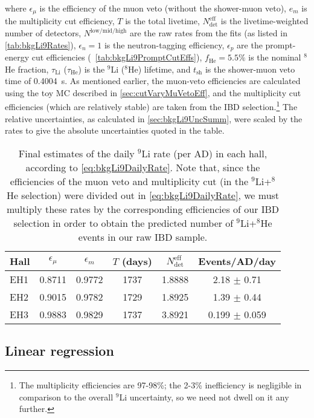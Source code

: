 \documentclass[../thesis.tex]{subfiles}
\begin{document}
where $\epsilon_\mu$ is the efficiency of the muon veto (without the shower-muon veto), $e_m$ is the multiplicity cut efficiency, $T$ is the total livetime, $N^{\mathrm{eff}}_{\mathrm{det}}$ is the livetime-weighted number of detectors, $N^{\mathrm{low/mid/high}}$ are the raw rates from the fits (as listed in \autoref{tab:bkgLi9Rates}), $\epsilon_n = 1$ is the neutron-tagging efficiency, $\epsilon_p$ are the prompt-energy cut efficiencies (~\autoref{tab:bkgLi9PromptCutEffs}), $f_{\mathrm{He}} = 5.5\%$ is the nominal $^8$He fraction, $\tau_{\mathrm{Li}}$ ($\tau_{\mathrm{He}}$) is the $^9$Li ($^8$He) lifetime, and $t_{\mathrm{sh}}$ is the shower-muon veto time of 0.4004~s. As mentioned earlier, the muon-veto efficiencies are calculated using the toy MC described in \autoref{sec:cutVaryMuVetoEff}, and the multiplicity cut efficiencies (which are relatively stable) are taken from the IBD selection.\footnote{The multiplicity efficiencies are 97-98\%; the 2-3\% inefficiency is negligible in comparison to the overall $^9$Li uncertainty, so we need not dwell on it any further.} The relative uncertainties, as calculated in \autoref{sec:bkgLi9UncSumm}, were scaled by the rates to give the absolute uncertainties quoted in the table.

\begin{table}[h]
  \begin{tabular}{lccccc}
    \toprule
    Hall & $\epsilon_\mu$ & $\epsilon_m$ & $T$ (days) & $N_{\mathrm{det}}^{\mathrm{eff}}$ & Events/AD/day \\
    \midrule
    EH1 & 0.8711 & 0.9772 & 1737 & 1.8888 & 2.18 $\pm$ 0.71 \\
    EH2 & 0.9015 & 0.9782 & 1729 & 1.8925 & 1.39 $\pm$ 0.44 \\
    EH3 & 0.9883 & 0.9829 & 1737 & 3.8921 & 0.199 $\pm$ 0.059 \\
    \bottomrule
  \end{tabular}
  \caption{Final estimates of the daily $^9$Li rate (per AD) in each hall, according to \autoref{eq:bkgLi9DailyRate}. Note that, since the efficiencies of the muon veto and multiplicity cut (in the $^9$Li+$^8$He selection) were divided out in \autoref{eq:bkgLi9DailyRate}, we must multiply these rates by the corresponding efficiencies of our IBD selection in order to obtain the predicted number of $^9$Li+$^8$He events in our raw IBD sample.}
  \label{tab:bkgLi9DailyRates}
\end{table}

\subsection{Linear regression}
\label{sec:bkgLi9LinReg}
\end{document}
